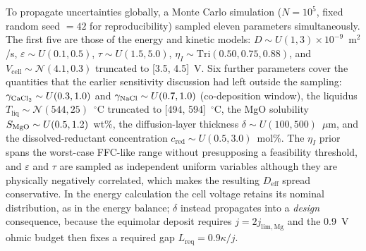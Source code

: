 \documentclass[11pt]{article}
\begin{document}
To propagate uncertainties globally, a Monte Carlo simulation ($N = 10^5$, fixed random seed $= 42$ for reproducibility) sampled eleven parameters simultaneously. The first five are those of the energy and kinetic models: $D \sim U(1, 3) \times 10^{-9}$~m$^2$/s, $\varepsilon \sim U(0.1, 0.5)$, $\tau \sim U(1.5, 5.0)$, $\eta_I \sim \mathrm{Tri}(0.50, 0.75, 0.88)$, and $V_{\mathrm{cell}} \sim \mathcal{N}(4.1, 0.3)$ truncated to [3.5, 4.5]~V. Six further parameters cover the quantities that the earlier sensitivity discussion had left outside the sampling: $\gamma_{\ce{CaCl2}} \sim U(0.3, 1.0)$ and $\gamma_{\ce{NaCl}} \sim U(0.7, 1.0)$ (co-deposition window), the liquidus $T_{\mathrm{liq}} \sim \mathcal{N}(544, 25)$~$^{\circ}$C truncated to [494, 594]~$^{\circ}$C, the MgO solubility $S_{\ce{MgO}} \sim U(0.5, 1.2)$~wt\%, the diffusion-layer thickness $\delta \sim U(100, 500)$~$\mu$m, and the dissolved-reductant concentration $c_{\mathrm{red}} \sim U(0.5, 3.0)$~mol\%. The $\eta_I$ prior spans the worst-case FFC-like range without presupposing a feasibility threshold, and $\varepsilon$ and $\tau$ are sampled as independent uniform variables although they are physically negatively correlated, which makes the resulting $D_{\mathrm{eff}}$ spread conservative. In the energy calculation the cell voltage retains its nominal distribution, as in the energy balance; $\delta$ instead propagates into a \emph{design} consequence, because the equimolar deposit requires $j = 2j_{\mathrm{lim,Mg}}$ and the 0.9~V ohmic budget then fixes a required gap $L_{\mathrm{req}} = 0.9\kappa/j$.
\end{document}
